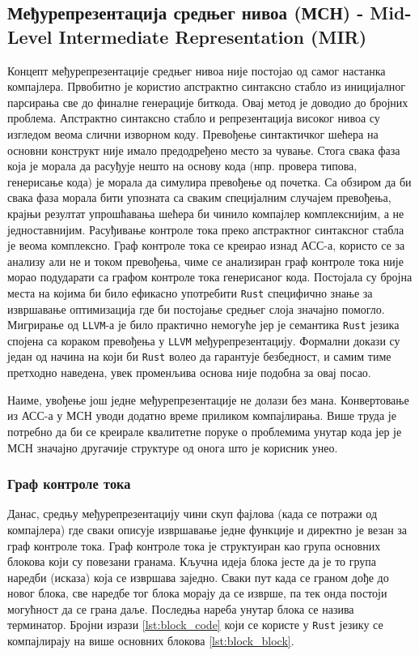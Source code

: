 \subsection{Међурепрезентација средњег нивоа (МСН) - Mid-Level Intermediate Representation (MIR)}

Концепт међурепрезентације средњег нивоа није постојао од самог настанка компајлера. Првобитно је користио апстрактно синтаксно стабло 
из иницијалног парсирања све до финалне генерације биткода. Овај метод је доводио до бројних проблема. Апстрактно синтаксно стабло и репрезентација 
високог нивоа су изгледом веома слични изворном коду. Превођење синтактичког шећера на основни конструкт није имало предодређено место за чување. 
Стога свака фаза која је морала да расуђује нешто на основу кода (нпр. провера типова, генерисање кода) је морала да симулира превођење од почетка.
Са обзиром да би свака фаза морала бити упозната са сваким специјалним случајем превођења, крајњи резултат упрошћавања шећера би чинило компајлер 
комплекснијим, а не једноставнијим. Расуђивање контроле тока преко апстрактног синтаксног стабла је веома комплексно. Граф контроле тока се креирао
изнад АСС-а, користо се за анализу али не и током превођења, чиме се анализиран граф контроле тока није морао подударати са графом контроле тока генерисаног кода. 
Постојала су бројна места на којима би било ефикасно употребити \verb|Rust| специфично знање за извршавање оптимизација где би постојање средњег слоја значајно помогло.
Мигрирање од \verb|LLVM|-а је било практично немогуће јер је семантика \verb|Rust| језика спојена са кораком превођења у \verb|LLVM| међурепрезентацију.
Формални докази су један од начина на који би \verb|Rust| волео да гарантује безбедност, и самим тиме претходно наведена, увек променљива 
основа није подобна за овај посао.

Наиме, увођење још једне међурепрезентације не долази без мана. Конвертовање из АСС-а у МСН уводи додатно време приликом компајлирања. Више труда је потребно 
да би се креирале квалитетне поруке о проблемима унутар кода јер је МСН значајно другачије структуре од онога што је корисник унео.

\subsubsection{Граф контроле тока}

Данас, средњу међурепрезентацију чини скуп фајлова (када се потражи од компајлера) где сваки описује извршавање једне функције и директно је везан за граф контроле тока. Граф контроле тока је 
структуиран као група основних блокова који су повезани гранама. Кључна идеја блока јесте да је то група наредби (исказа) 
која се извршава заједно. Сваки пут када се граном дође до новог блока, све наредбе тог блока морају да се изврше, па тек онда постоји могућност 
да се грана даље. Последња нареба унутар блока се назива терминатор. Бројни изрази \ref{lst:block_code} који се користе у \verb|Rust| језику се компајлирају на 
више основних блокова \ref{lst:block_block}.

